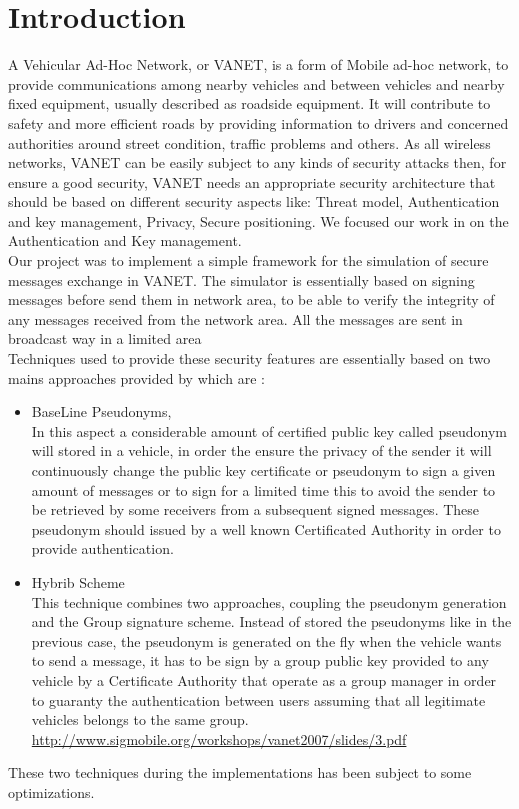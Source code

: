 \section{Introduction}
A Vehicular Ad-Hoc Network, or VANET, is a form of Mobile ad-hoc network, to provide communications among nearby vehicles and between vehicles and nearby fixed equipment, usually described as roadside equipment. It will contribute to safety and more efficient roads by providing information to drivers and concerned authorities around street condition, traffic problems and others.
As all wireless networks, VANET can be easily subject to any kinds of security  attacks then, for ensure a good security, VANET needs an appropriate security architecture that should be based on different security aspects like: Threat model, Authentication and key management, Privacy, Secure positioning. We focused our work in on the Authentication and Key management.\\
Our project was to implement a simple framework for the simulation of secure messages exchange in VANET. The simulator is essentially based on  signing  messages before send them in network area, to be able to verify the integrity of any messages received from the network area. All the messages are sent in broadcast way in a limited area\\
Techniques used to provide these security features are essentially based on two mains approaches provided by\cite{calandriello} which are :
\begin{itemize}
\item BaseLine Pseudonyms,\\
In this aspect a considerable amount of certified public key called pseudonym will stored in a vehicle, in order the ensure the privacy of the sender it will continuously change the public key certificate or pseudonym to sign a given amount of messages or to sign for a limited time this to avoid the sender to be retrieved by some receivers from a subsequent signed messages. These pseudonym should issued by a well known Certificated Authority in order to provide authentication.
\item Hybrib Scheme\\
This technique combines two approaches, coupling the pseudonym generation and the Group signature scheme.
Instead of stored the pseudonyms like in the previous case, the pseudonym  is generated on the fly when the vehicle wants to send a message, it has to be sign by a group public key provided to any vehicle by a Certificate Authority that operate as a group manager in order to guaranty the authentication between users assuming that all legitimate vehicles belongs to the same group.
\\
\url{http://www.sigmobile.org/workshops/vanet2007/slides/3.pdf}
\end{itemize}
These two techniques during the implementations has been subject to some optimizations.

